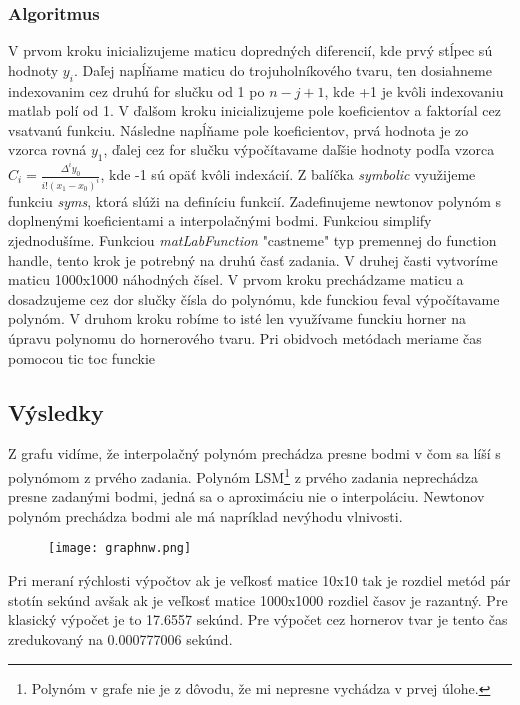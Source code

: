 \documentclass{article}
\theoremstyle{definition}
\theoremstyle{remark}
\begin{document}
\subsubsection{Algoritmus}\label{sec:nothing2}
V prvom kroku inicializujeme maticu dopredných diferencií, kde prvý stĺpec sú hodnoty $y_i$.
Daľej napĺňame maticu do trojuholníkového tvaru, ten dosiahneme indexovanim cez druhú for slučku
od 1 po $n-j+1$, kde +1 je kvôli indexovaniu matlab polí od 1. V ďalšom kroku inicializujeme pole koeficientov a faktoríal cez vsatvanú funkciu. Následne napĺňame pole koeficientov, prvá hodnota je zo vzorca rovná $y_1$, ďalej cez for slučku výpočítavame daľšie hodnoty podľa vzorca $C_i=\frac{\Delta^iy_0}{i!(x_1-x_0)^i}$, kde -1 sú opäť kvôli indexácií. Z balíčka \emph{symbolic} využijeme funkciu \emph{syms}, ktorá slúži na definíciu funkcií. Zadefinujeme newtonov polynóm s doplnenými koeficientami a interpolačnými bodmi. Funkciou simplify zjednodušíme. Funkciou \emph{matLabFunction} "castneme" typ premennej do function handle, tento krok je potrebný na druhú časť zadania. V druhej časti
vytvoríme maticu 1000x1000 náhodných čísel. V prvom kroku prechádzame maticu a dosadzujeme cez dor slučky čísla do polynómu, kde funckiou feval výpočítavame polynóm. V druhom kroku robíme to isté len využívame funckiu horner na úpravu polynomu do hornerového tvaru. Pri obidvoch metódach meriame čas pomocou tic toc funckie 

\subsection{Výsledky}\label{sec:nothing}
Z grafu vidíme, že interpolačný polynóm prechádza presne bodmi v čom sa líší s polynómom z prvého zadania. Polynóm LSM\footnote{Polynóm v grafe nie je z dôvodu, že mi nepresne vychádza v prvej úlohe.} z prvého zadania neprechádza presne zadanými bodmi, jedná sa o aproximáciu nie o interpoláciu. Newtonov polynóm prechádza bodmi ale má napríklad nevýhodu vlnivosti. 
\begin{figure}[!htb]
\texttt{[image: graphnw.png]}
\centering
\end{figure}
Pri meraní rýchlosti výpočtov ak je veľkosť matice 10x10 tak je rozdiel metód pár stotín sekúnd avšak ak je veľkosť matice 1000x1000 rozdiel časov je razantný. Pre klasický výpočet je to 17.6557 sekúnd. Pre výpočet cez hornerov tvar je tento čas zredukovaný na 0.000777006 sekúnd.
\end{document}
